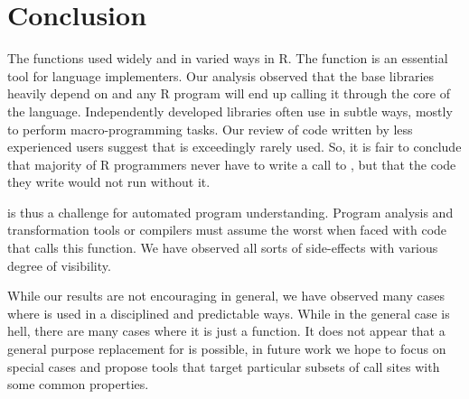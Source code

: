 \documentclass[screen,acmsmall]{acmart}%
\begin{document}
\section{Conclusion}

The \eval functions used widely and in varied ways in R. The function is an
essential tool for language implementers. Our analysis observed that the base
libraries heavily depend on \eval and any R program will end up calling it
through the core of the language. Independently developed libraries often use
\eval in subtle ways, mostly to perform macro-programming tasks. Our review of
code written by less experienced users suggest that \eval is exceedingly rarely
used. So, it is fair to conclude that majority of R programmers never have to
write a call to \eval, but that the code they write would not run without it.

\Eval is thus a challenge for automated program understanding. Program analysis
and transformation tools or compilers must assume the worst when faced with code
that calls this function. We have observed all sorts of side-effects with
various degree of visibility.

While our results are not encouraging in general, we have observed many cases
where \eval is used in a disciplined and predictable ways. While in the general
case \eval is hell, there are many cases where it is just a function. It does
not appear that a general purpose replacement for \eval is possible, in future
work we hope to focus on special cases and propose tools that target particular
subsets of call sites with some common properties.



\end{document}
